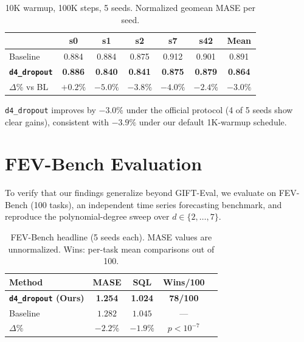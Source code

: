\documentclass{article}
\begin{document}
\begin{table}[H]
\centering
\caption{10K warmup, 100K steps, 5 seeds. Normalized geomean MASE per seed.}
\label{tab:official-schedule}
\small
\begin{tabular}{lcccccc}
\toprule
& \textbf{s0} & \textbf{s1} & \textbf{s2} & \textbf{s7} & \textbf{s42} & \textbf{Mean} \\
\midrule
Baseline & 0.884 & 0.884 & 0.875 & 0.912 & 0.901 & 0.891 \\
\textbf{\texttt{d4\_dropout}} & \textbf{0.886} & \textbf{0.840} & \textbf{0.841} & \textbf{0.875} & \textbf{0.879} & \textbf{0.864} \\
\midrule
$\Delta$\% vs BL & $+0.2\%$ & $-5.0\%$ & $-3.8\%$ & $-4.0\%$ & $-2.4\%$ & $-3.0\%$ \\
\bottomrule
\end{tabular}
\end{table}

\texttt{d4\_dropout} improves by $-3.0\%$ under the official protocol (4 of 5 seeds show clear gains), consistent with $-3.9\%$ under our default 1K-warmup schedule.

\section{FEV-Bench Evaluation}
\label{app:fevbench}

To verify that our findings generalize beyond GIFT-Eval, we evaluate on FEV-Bench (100 tasks), an independent time series forecasting benchmark, and reproduce the polynomial-degree sweep over $d \in \{2, \ldots, 7\}$.

\begin{table}[H]
\centering
\caption{FEV-Bench headline (5 seeds each). MASE values are unnormalized. Wins: per-task mean comparisons out of 100.}
\small
\begin{tabular}{lcccc}
\toprule
\textbf{Method} & \textbf{MASE} & \textbf{SQL} & \textbf{Wins/100} \\
\midrule
\textbf{\texttt{d4\_dropout} (Ours)} & \textbf{1.254} & \textbf{1.024} & \textbf{78/100} \\
Baseline & $1.282$ & $1.045$ & --- \\
$\Delta\%$ & $-2.2\%$ & $-1.9\%$ & $p < 10^{-7}$ \\
\bottomrule
\end{tabular}
\end{table}
\end{document}
